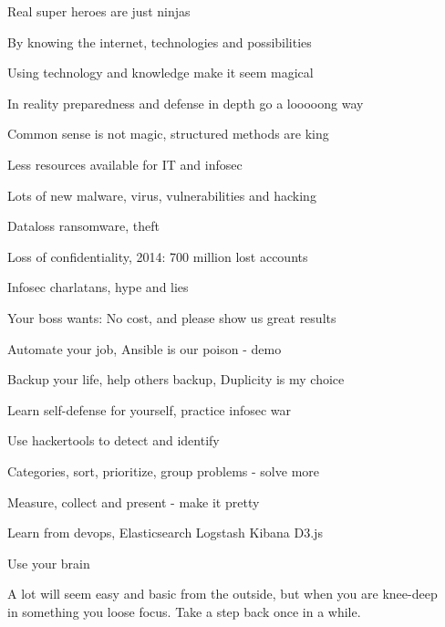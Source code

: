 \documentclass[20pt,landscape,a4paper,footrule]{foils}
\begin{document}

\begin{list1}
\item Real super heroes are just ninjas
\item By knowing the internet, technologies and possibilities
\item Using technology and knowledge make it seem magical
\item In reality preparedness and defense in depth go a looooong way
\item Common sense is not magic, structured methods are king
\end{list1}


\begin{list1}
\item Less resources available for IT and infosec
\item Lots of new malware, virus, vulnerabilities and hacking
\item Dataloss ransomware, theft
\item Loss of confidentiality, 2014: 700 million lost accounts
\item Infosec charlatans, hype and lies
\end{list1}

\vskip 2cm
\centerline{Your boss wants: No cost, and please show us great results}


\begin{list1}
\item Automate your job, Ansible is our poison - demo
\item Backup your life, help others backup, Duplicity is my choice
\item Learn self-defense for yourself, practice infosec war 
\item Use hackertools to detect and identify
\item Categories, sort, prioritize, group problems - solve more
\item Measure, collect and present - make it pretty
\item Learn from devops, Elasticsearch Logstash Kibana D3.js
\end{list1}


\centerline{Use your brain}

A lot will seem easy and basic from the outside, but when you are knee-deep\\
in something you loose focus. Take a step back once in a while.
\end{document}

